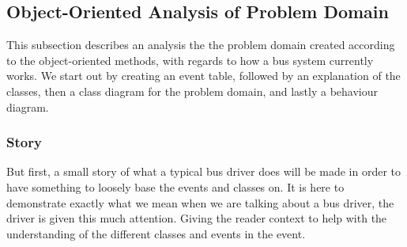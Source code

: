 \subsection{Object-Oriented Analysis of Problem Domain}
This subsection describes an analysis the the problem domain created according to the object-oriented methods, with regards to how a bus system currently works. We start out by creating an event table, followed by an explanation of the classes, then a class diagram for the problem domain, and lastly a behaviour diagram.

\subsubsection{Story}
But first, a small story of what a typical bus driver does will be made in order to have something to loosely base the events and classes on. It is here to demonstrate exactly what we mean when we are talking about a bus driver, the driver is given this much attention. Giving the reader context to help with the understanding of the different classes and events in the event.

